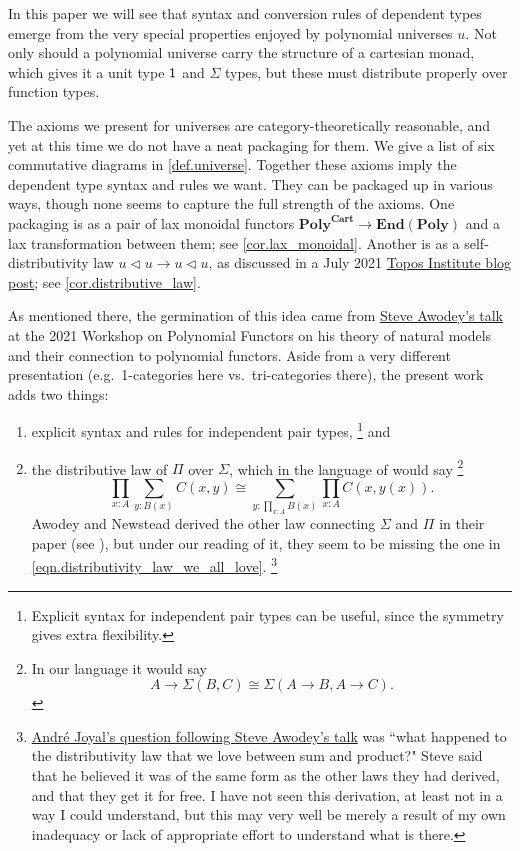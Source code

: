 \documentclass[11pt, one side, article]{memoir}
\theoremstyle{definition}
\theoremstyle{plain}
\newcommand{\Cat}[1]{\mathbf{#1}}%
\newcommand{\en}{\Cat{End}}
\newcommand{\poly}{\Cat{Poly}}
\newcommand{\polycart}{\poly^{\Cat{Cart}}}
\newcommand{\0}{\textsf{0}}
\newcommand{\1}{\tn{\textsf{1}}}
\newcommand{\tri}{\mathbin{\triangleleft}}
\begin{document}
In this paper we will see that syntax and conversion rules of dependent types  emerge from the very special properties enjoyed by polynomial universes $u$. Not only should a polynomial universe carry the structure of a cartesian monad, which gives it a unit type $\1$ and $\Sigma$ types, but these must distribute properly over function types. 

The axioms we present for universes are category-theoretically reasonable, and yet at this time we do not have a neat packaging for them. We give a list of six commutative diagrams in \cref{def.universe}. Together these axioms imply the dependent type syntax and rules we want. They can be packaged up in various ways, though none seems to capture the full strength of the axioms. One packaging is as a pair of lax monoidal functors $\polycart\to\en(\poly)$ and a lax transformation between them; see \cref{cor.lax_monoidal}. Another is as a self-distributivity law $u\tri u\to u\tri u$, as discussed in a July 2021 \href{https://topos.site/blog/2021/07/jump-monads-from-conjugation-to-dependent-types/}{Topos Institute blog post}; see \cref{cor.distributive_law}.

As mentioned there, the germination of this idea came from \href{https://www.youtube.com/watch?v=RDuNIP4icKI\&t=10765s}{Steve Awodey's talk} at the 2021 Workshop on Polynomial Functors on his theory of natural models and their connection to polynomial functors. Aside from a very different presentation (e.g.\ 1-categories here vs.\ tri-categories there), the present work adds two things:
\begin{enumerate}
	\item explicit syntax and rules for independent pair types,%
	\footnote{Explicit syntax for independent pair types can be useful, since the symmetry gives extra flexibility.}
	 and
	\item the distributive law of $\Pi$ over $\Sigma$, which in the language of \cite{awodey2018polynomial} would say%
	\footnote{In our language it would say 
	\[
	A\to\Sigma(B,C)\cong \Sigma(A\to B,A\to C).
	\]
	}
	\begin{equation}\label{eqn.distributivity_law_we_all_love}
	\prod_{x:A}\sum_{y:B(x)}C(x,y)\cong\sum_{y:\prod_{x:A}B(x)}\prod_{x:A}C(x,y(x)).
	\end{equation}
	Awodey and Newstead derived the other law connecting $\Sigma$ and $\Pi$ in their paper (see \cite[Remark 4.2]{awodey2018polynomial}), but under our reading of it, they seem to be missing the one in \eqref{eqn.distributivity_law_we_all_love}.%
	\footnote{\href{https://youtu.be/RDuNIP4icKI?t=13898}{Andr\'{e} Joyal's question following Steve Awodey's talk} was ``what happened to the distributivity law that we love between sum and product?" Steve said that he believed it was of the same form as the other laws they had derived, and that they get it for free. I have not seen this derivation, at least not in a way I could understand, but this may very well be merely a result of my own inadequacy or lack of appropriate effort to understand what is there.}
\end{enumerate}
\end{document}
